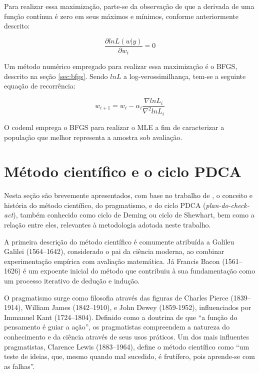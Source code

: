 \documentclass[cic,tc]{iiufrgs}
\begin{document}
Para realizar essa maximização, parte-se da observação de que a derivada de uma
função contínua é zero em seus máximos e mínimos, conforme anteriormente
descrito:

$$ \frac{\partial ln L(w|y)}{\partial w_i} = 0 $$


Um método numérico empregado para realizar essa maximização é o BFGS, descrito
na seção \ref{sec:bfgs}. Sendo $lnL$ a log-verossimilhança, tem-se a seguinte
equação de recorrência:

$$ w_{i+1} = w_i - \alpha_i \frac{\nabla lnL_i}{\nabla^2 lnL_i} $$

O codeml emprega o BFGS para realizar o MLE a fim de caracterizar a população
que melhor representa a amostra sob avaliação.


\section{Método científico e o ciclo PDCA}
\label{sec:pdca}

Nesta seção são brevemente apresentados, com base no trabalho de
\cite{moen2006evolution}, o conceito e história do método científico, do
pragmatismo, e do ciclo PDCA (\textit{plan-do-check-act}), também conhecido
como ciclo de Deming ou ciclo de Shewhart, bem como a relação entre eles,
relevantes à metodologia adotada neste trabalho.

A primeira descrição do método científico é comumente atribuída a Galileu
Galilei (1564--1642), considerado o pai da ciência moderna, ao combinar
experimentação empírica com avaliação matemática. Já Francis Bacon (1561--1626)
é um expoente inicial do método que contribuiu à sua fundamentação como um
processo iterativo de dedução e indução.

O pragmatismo surge como filosofia através das figuras de Charles Pierce
(1839--1914), William James (1842--1910), e John Dewey (1859-1952),
influenciados por Immanuel Kant (1724--1804). Definido como a doutrina de que
``a função do pensamento é guiar a ação'', os pragmatistas compreendem a
natureza do conhecimento e da ciência através de seus usos práticos. Um dos
mais influentes pragmatistas, Clarence Lewis (1883--1964), define o método
científico como ``um teste de ideias, que, mesmo quando mal sucedido, é
frutífero, pois aprende-se com as falhas''. 
\end{document}
